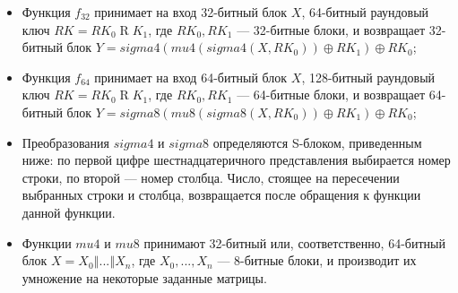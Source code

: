 \documentclass{./civarticle}
\begin{document}
\begin{itemize}
    \item Функция $f_{32}$ принимает на вход 32-битный блок $X$, 64-битный раундовый ключ $RK = RK_0 \mathbin RK_1$, где $RK_0, RK_1$ --- 32-битные блоки, и возвращает 32-битный блок $Y = sigma4(mu4(sigma4(X, RK_0)) \oplus RK_1)\oplus RK_0$;

    \item Функция $f_{64}$ принимает на вход 64-битный блок $X$, 128-битный раундовый ключ $RK = RK_0 \mathbin RK_1$, где $RK_0, RK_1$ --- 64-битные блоки, и возвращает 64-битный блок $Y = sigma8(mu8(sigma8(X, RK_0)) \oplus RK_1)\oplus RK_0$;

    \begin{figure}[h!]
    \end{figure}

    \item Преобразования $sigma4$ и $sigma8$ определяются S-блоком, приведенным ниже: по первой цифре шестнадцатеричного представления выбирается номер строки, по второй --- номер столбца. Число, стоящее на пересечении выбранных строки и столбца, возвращается после обращения к функции данной функции.

    \begin{figure}[h!]
    \end{figure}

    \item Функции $mu4$ и $mu8$ принимают 32-битный или, соответственно, 64-битный блок $X = X_0 \mathbin\Vert ... \mathbin\Vert X_n$, где $X_0, ..., X_n$ --- 8-битные блоки, и производит их умножение на некоторые заданные матрицы.


\end{itemize}
\end{document}
